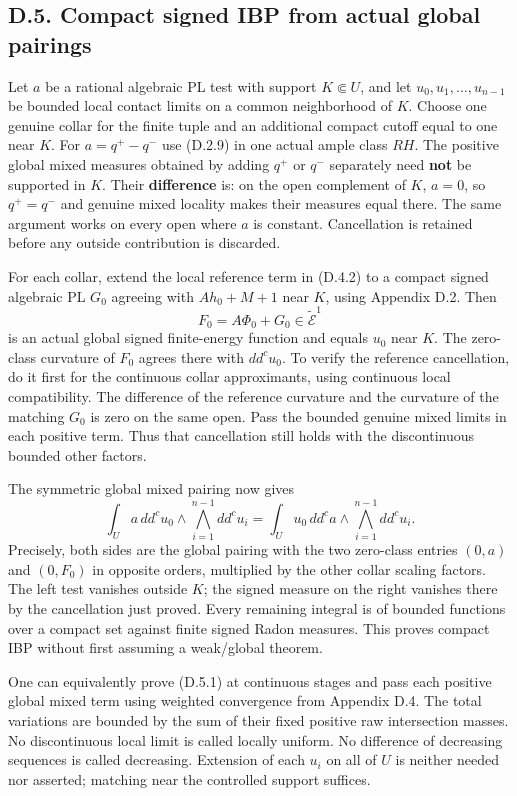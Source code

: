 \documentclass[
  10pt,
]{article}
\begin{document}
\subsection{D.5. Compact signed IBP from actual global
pairings}\label{d.5.-compact-signed-ibp-from-actual-global-pairings}

Let \(a\) be a rational algebraic PL test with support \(K\Subset U\),
and let \(u_0,u_1,\ldots,u_{n-1}\) be bounded local contact limits on a
common neighborhood of \(K\). Choose one genuine collar for the finite
tuple and an additional compact cutoff equal to one near \(K\). For
\(a=q^+-q^-\) use (D.2.9) in one actual ample class \(RH\). The positive
global mixed measures obtained by adding \(q^+\) or \(q^-\) separately
need \textbf{not} be supported in \(K\). Their \textbf{difference} is:
on the open complement of \(K\), \(a=0\), so \(q^+=q^-\) and genuine
mixed locality makes their measures equal there. The same argument works
on every open where \(a\) is constant. Cancellation is retained before
any outside contribution is discarded.

For each collar, extend the local reference term in (D.4.2) to a compact
signed algebraic PL \(G_0\) agreeing with \(Ah_0+M+1\) near \(K\), using
Appendix D.2. Then \[F_0=A\Phi_0+G_0\in\widetilde{\mathcal E}^{1}\] is
an actual global signed finite-energy function and equals \(u_0\) near
\(K\). The zero-class curvature of \(F_0\) agrees there with
\(dd^cu_0\). To verify the reference cancellation, do it first for the
continuous collar approximants, using continuous local compatibility.
The difference of the reference curvature and the curvature of the
matching \(G_0\) is zero on the same open. Pass the bounded genuine
mixed limits in each positive term. Thus that cancellation still holds
with the discontinuous bounded other factors.

The symmetric global mixed pairing now gives
\[\int_U a\,dd^cu_0\wedge\bigwedge_{i=1}^{n-1}dd^cu_i
=\int_U u_0\,dd^ca\wedge\bigwedge_{i=1}^{n-1}dd^cu_i. \tag{D.5.1}\]
Precisely, both sides are the global pairing with the two zero-class
entries \((0,a)\) and \((0,F_0)\) in opposite orders, multiplied by the
other collar scaling factors. The left test vanishes outside \(K\); the
signed measure on the right vanishes there by the cancellation just
proved. Every remaining integral is of bounded functions over a compact
set against finite signed Radon measures. This proves compact IBP
without first assuming a weak/global theorem.

One can equivalently prove (D.5.1) at continuous stages and pass each
positive global mixed term using weighted convergence from Appendix D.4.
The total variations are bounded by the sum of their fixed positive raw
intersection masses. No discontinuous local limit is called locally
uniform. No difference of decreasing sequences is called decreasing.
Extension of each \(u_i\) on all of \(U\) is neither needed nor
asserted; matching near the controlled support suffices.
\end{document}
